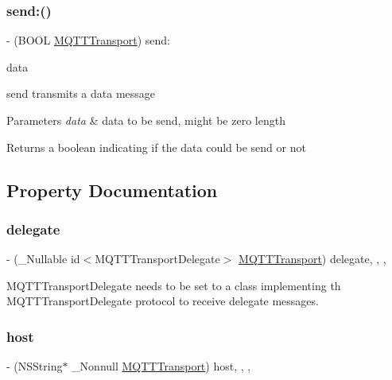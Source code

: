 \subsubsection{\texorpdfstring{send\+:()}{send:()}}
{\footnotesize\ttfamily -\/ (B\+O\+OL \hyperlink{interface_m_q_t_t_transport}{M\+Q\+T\+T\+Transport}) send\+: \begin{DoxyParamCaption}\item[{(nonnull N\+S\+Data $\ast$)}]{data }\end{DoxyParamCaption}}

send transmits a data message 
\begin{DoxyParams}{Parameters}
{\em data} & data to be send, might be zero length \\
\hline
\end{DoxyParams}
\begin{DoxyReturn}{Returns}
a boolean indicating if the data could be send or not 
\end{DoxyReturn}


\subsection{Property Documentation}
\mbox{\label{protocol_m_q_t_t_transport_01-p_a182ba6c4509d5b5e38ec0c783cd1b26d}} 
\subsubsection{\texorpdfstring{delegate}{delegate}}
{\footnotesize\ttfamily -\/ (\+\_\+\+Nullable id$<$M\+Q\+T\+T\+Transport\+Delegate$>$ \hyperlink{interface_m_q_t_t_transport}{M\+Q\+T\+T\+Transport}) delegate\hspace{0.3cm}{\ttfamily [read]}, {\ttfamily [write]}, {\ttfamily [nonatomic]}, {\ttfamily [strong]}}

M\+Q\+T\+T\+Transport\+Delegate needs to be set to a class implementing th M\+Q\+T\+T\+Transport\+Delegate protocol to receive delegate messages. \mbox{\label{protocol_m_q_t_t_transport_01-p_a1ffe0631c337850b0bcbdd061a89b355}} 
\subsubsection{\texorpdfstring{host}{host}}
{\footnotesize\ttfamily -\/ (N\+S\+String$\ast$ \+\_\+\+Nonnull \hyperlink{interface_m_q_t_t_transport}{M\+Q\+T\+T\+Transport}) host\hspace{0.3cm}{\ttfamily [read]}, {\ttfamily [write]}, {\ttfamily [nonatomic]}, {\ttfamily [strong]}}

